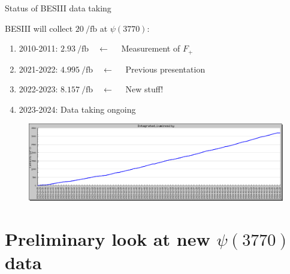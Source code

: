 \documentclass{beamer}
\begin{document}
\begin{frame}{Status of BESIII data taking}
  \begin{center}
    \Large{BESIII will collect $\SI{20}{\per\femto\barn}$ at $\psi(3770)$:}
  \end{center}
  \vspace{0.1cm}
  \begin{enumerate}
    \setlength\itemsep{0.7em}
    \item{2010-2011: $\SI{2.93}{\per\femto\barn}\quad\leftarrow\quad$ Measurement of $F_+$}
    \item{2021-2022: $\SI{4.995}{\per\femto\barn}\quad\leftarrow\quad$ Previous presentation}
    \item{2022-2023: $\SI{8.157}{\per\femto\barn}\quad\leftarrow\quad$ New stuff!}
    \item{2023-2024: Data taking ongoing}
  \end{enumerate}
  \begin{figure}
    \centering
    \includegraphics[width = 1.0\textwidth]{Plots/BESIII_Luminosity.png}
  \end{figure}
\end{frame}

\section{Preliminary look at new $\psi(3770)$ data}
\end{document}
